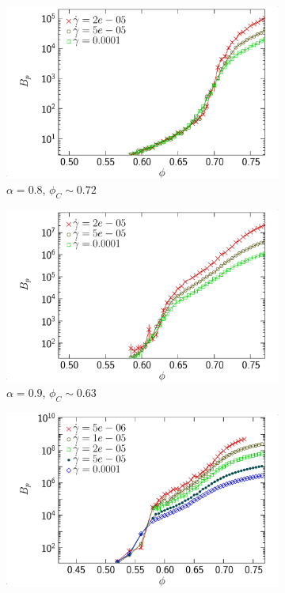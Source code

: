 \documentclass[class=report, float=false, crop=false]{standalone}
\begin{document}
\begin{figure}[h!]
\centering
    \begin{subfigure}[t]{0.32\textwidth}
        \centering
        \includegraphics[width=\textwidth]{figures/figs/bp_0064_KDk500_Ml100_EL080}
        \caption{$\alpha=0.8$, $\phi_C\sim0.72$}
        \label{bp_0064_KDk500_Ml100_EL080}
    \end{subfigure}
    \hfill
    \begin{subfigure}[t]{0.32\textwidth}
        \centering
        \includegraphics[width=\textwidth]{figures/figs/bp_0064_KDk500_Ml100_EL090}
        \caption{$\alpha=0.9$, $\phi_C\sim0.63$}
        \label{bp_0064_KDk500_Ml100_EL090}
    \end{subfigure}
    \hfill
    \begin{subfigure}[t]{0.32\textwidth}
        \centering
        \includegraphics[width=\textwidth]{figures/figs/bp_0064_KDk500_Ml100_EL130}

\end{subfigure}
\end{figure}
\end{document}

